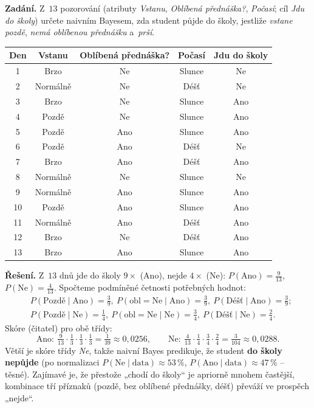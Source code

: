 \begin{priklad}
\par
\textbf{Zadání.} Z~$13$ pozorování (atributy \emph{Vstanu}, \emph{Oblíbená přednáška?}, \emph{Počasí}; cíl \emph{Jdu do školy}) určete naivním Bayesem, zda student půjde do školy, jestliže \emph{vstane pozdě}, \emph{nemá oblíbenou přednášku} a~\emph{prší}.
\begin{center}\small
\begin{tabular}{ccccc}
\toprule
Den & Vstanu & Oblíbená přednáška? & Počasí & Jdu do školy\\
\midrule
1 & Brzo & Ne & Slunce & Ne\\
2 & Normálně & Ne & Déšť & Ne\\
3 & Brzo & Ne & Slunce & Ano\\
4 & Pozdě & Ne & Slunce & Ano\\
5 & Pozdě & Ano & Slunce & Ano\\
6 & Pozdě & Ano & Déšť & Ne\\
7 & Brzo & Ano & Déšť & Ano\\
8 & Normálně & Ne & Slunce & Ne\\
9 & Normálně & Ano & Slunce & Ano\\
10 & Pozdě & Ano & Slunce & Ano\\
11 & Normálně & Ano & Déšť & Ano\\
12 & Brzo & Ne & Déšť & Ano\\
13 & Brzo & Ano & Slunce & Ano\\
\bottomrule
\end{tabular}
\end{center}

\smallskip
\textbf{Řešení.} Z~$13$ dnů jde do školy $9\times$ (Ano), nejde $4\times$ (Ne): $P(\text{Ano})=\tfrac{9}{13}$, $P(\text{Ne})=\tfrac{4}{13}$. Spočteme podmíněné četnosti potřebných hodnot:
\[
\begin{aligned}
&P(\text{Pozdě}\mid\text{Ano})=\tfrac{3}{9},\ P(\text{obl}{=}\text{Ne}\mid\text{Ano})=\tfrac{3}{9},\ P(\text{Déšť}\mid\text{Ano})=\tfrac{3}{9};\\
&P(\text{Pozdě}\mid\text{Ne})=\tfrac{1}{4},\ P(\text{obl}{=}\text{Ne}\mid\text{Ne})=\tfrac{3}{4},\ P(\text{Déšť}\mid\text{Ne})=\tfrac{2}{4}.
\end{aligned}
\]
Skóre (čitatel) pro obě třídy:
\[ \text{Ano}:\ \tfrac{9}{13}\cdot\tfrac13\cdot\tfrac13\cdot\tfrac13=\tfrac{1}{39}\approx 0{,}0256,\qquad \text{Ne}:\ \tfrac{4}{13}\cdot\tfrac14\cdot\tfrac34\cdot\tfrac24=\tfrac{3}{104}\approx 0{,}0288. \]
Větší je skóre třídy \emph{Ne}, takže naivní Bayes predikuje, že student \textbf{do školy nepůjde} (po normalizaci $P(\text{Ne}\mid\text{data})\approx 53\,\%$, $P(\text{Ano}\mid\text{data})\approx 47\,\%$ -- těsné). Zajímavé je, že přestože „chodí do školy`` je apriorně mnohem častější, kombinace tří příznaků (pozdě, bez oblíbené přednášky, déšť) převáží ve prospěch „nejde``.
\end{priklad}

